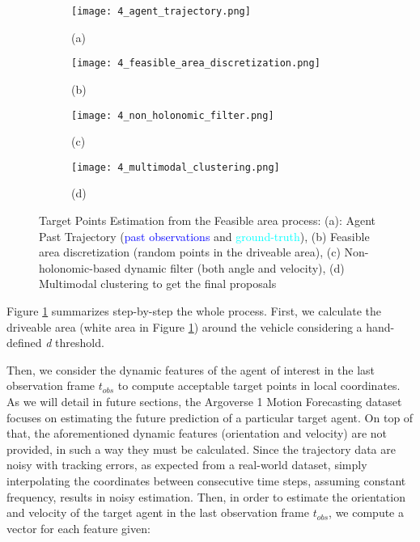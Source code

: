\begin{figure}[!ht]
	\centering
	\begin{subfigure}{0.24\textwidth}
		\texttt{[image: 4\_agent\_trajectory.png]}	
		\caption{(a)}
	\end{subfigure}
	\hfill
	\begin{subfigure}{0.24\textwidth}
		\texttt{[image: 4\_feasible\_area\_discretization.png]}
		\caption{(b)}
	\end{subfigure}
	\hfill
	\begin{subfigure}{0.24\textwidth}
		\texttt{[image: 4\_non\_holonomic\_filter.png]}
		\caption{(c)}
	\end{subfigure}
	\hfill
	\begin{subfigure}{0.24\textwidth}
		\texttt{[image: 4\_multimodal\_clustering.png]}
		\caption{(d)}
	\end{subfigure}
	\caption[Target Points Estimation from the Feasible area process]{Target Points Estimation from the Feasible area process: (a): Agent Past Trajectory (\textcolor{blue}{past observations} and \textcolor{aqua}{ground-truth}), (b) Feasible area discretization (random points in the driveable area), (c) Non-holonomic-based dynamic filter (both angle and velocity), (d) Multimodal clustering to get the final proposals}
	\label{fig:4_target_points_extraction}
\end{figure}

Figure \ref{fig:4_target_points_extraction} summarizes step-by-step the whole process. First, we calculate the driveable area (white area in Figure \ref{fig:4_target_points_extraction}) around the vehicle considering a hand-defined \textit{d} threshold.

Then, we consider the dynamic features of the agent of interest in the last observation frame $t_{obs}$ to compute acceptable target points in local coordinates. As we will detail in future sections, the Argoverse 1 Motion Forecasting dataset focuses on estimating the future prediction of a particular target agent. On top of that, the aforementioned dynamic features (orientation and velocity) are not provided, in such a way they must be calculated. Since the trajectory data are noisy with tracking errors, as expected from a real-world dataset, simply interpolating the coordinates between consecutive time steps, assuming constant frequency, results in noisy estimation. Then, in order to estimate the orientation and velocity of the target agent in the last observation frame $t_{obs}$, we compute a vector for each feature given:

